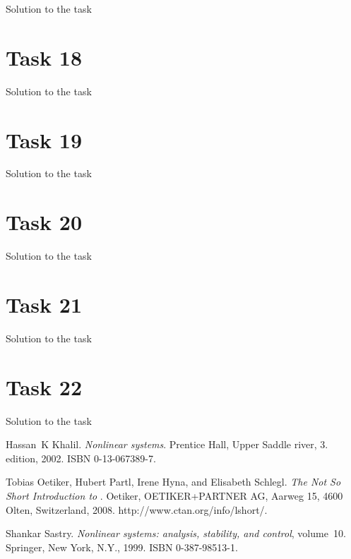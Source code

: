\documentclass[a4paper,12pt,oneside,onecolumn]{article} %
\begin{document}
Solution to the task

\section*{Task 18}

Solution to the task

\section*{Task 19}

Solution to the task

\section*{Task 20}

Solution to the task

\section*{Task 21}

Solution to the task

\section*{Task 22}

Solution to the task




\begin{thebibliography}{99}
Hassan~K Khalil.
\newblock \emph{Nonlinear systems}.
\newblock Prentice Hall, Upper Saddle river, 3. edition, 2002.
\newblock ISBN 0-13-067389-7.

Tobias Oetiker, Hubert Partl, Irene Hyna, and Elisabeth Schlegl.
\newblock \emph{The Not So Short Introduction to \LaTeXe}.
\newblock Oetiker, OETIKER+PARTNER AG, Aarweg 15, 4600 Olten, Switzerland,
  2008.
\newblock http://www.ctan.org/info/lshort/.

Shankar Sastry.
\newblock \emph{Nonlinear systems: analysis, stability, and control},
  volume~10.
\newblock Springer, New York, N.Y., 1999.
\newblock ISBN 0-387-98513-1.
\end{thebibliography}
\end{document}
